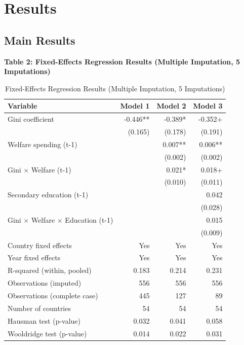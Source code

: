 \documentclass[11pt,letterpaper]{article}
\begin{document}
\section{Results}

\subsection{Main Results}

\textbf{Table 2: Fixed-Effects Regression Results (Multiple Imputation, 5 Imputations)}

\begin{table}[!htbp]
  \centering
  \caption{Fixed-Effects Regression Results (Multiple Imputation, 5 Imputations)}
  \begin{tabular}{lrrr}
    \toprule
    Variable & Model 1 & Model 2 & Model 3 \\
    \midrule
    Gini coefficient & -0.446** & -0.389* & -0.352+ \\
    & (0.165) & (0.178) & (0.191) \\
    Welfare spending (t-1) & & 0.007** & 0.006** \\
    & & (0.002) & (0.002) \\
    Gini $\times$ Welfare (t-1) & & 0.021* & 0.018+ \\
    & & (0.010) & (0.011) \\
    Secondary education (t-1) & & & 0.042 \\
    & & & (0.028) \\
    Gini $\times$ Welfare $\times$ Education (t-1) & & & 0.015 \\
    & & & (0.009) \\
    \midrule
    Country fixed effects & Yes & Yes & Yes \\
    Year fixed effects & Yes & Yes & Yes \\
    R-squared (within, pooled) & 0.183 & 0.214 & 0.231 \\
    Observations (imputed) & 556 & 556 & 556 \\
    Observations (complete case) & 445 & 127 & 89 \\
    Number of countries & 54 & 54 & 54 \\
    Hausman test (p-value) & 0.032 & 0.041 & 0.058 \\
    Wooldridge test (p-value) & 0.014 & 0.022 & 0.031 \\
    \bottomrule
  \end{tabular}
  \label{tab:main}
\end{table}
\end{document}
